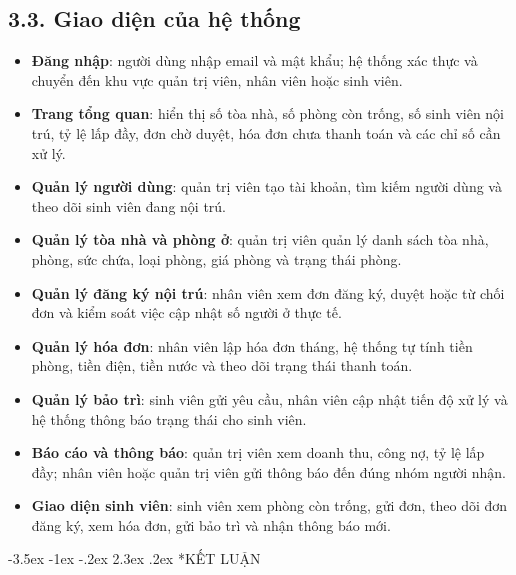 \documentclass[13pt,a4paper]{extarticle}
\makeatletter
\renewcommand\section{\@startsection {section}{1}{\z@}%
	{-3.5ex \@plus -1ex \@minus -.2ex}%
	{2.3ex \@plus .2ex}%
	{\centering\normalfont\Large\bfseries}}
\makeatother
\begin{document}
	\subsection*{3.3. Giao diện của hệ thống}
	\begin{itemize}
		\item \textbf{Đăng nhập}: người dùng nhập email và mật khẩu; hệ thống xác thực và chuyển đến khu vực quản trị viên, nhân viên hoặc sinh viên.
		\item \textbf{Trang tổng quan}: hiển thị số tòa nhà, số phòng còn trống, số sinh viên nội trú, tỷ lệ lấp đầy, đơn chờ duyệt, hóa đơn chưa thanh toán và các chỉ số cần xử lý.
		\item \textbf{Quản lý người dùng}: quản trị viên tạo tài khoản, tìm kiếm người dùng và theo dõi sinh viên đang nội trú.
		\item \textbf{Quản lý tòa nhà và phòng ở}: quản trị viên quản lý danh sách tòa nhà, phòng, sức chứa, loại phòng, giá phòng và trạng thái phòng.
		\item \textbf{Quản lý đăng ký nội trú}: nhân viên xem đơn đăng ký, duyệt hoặc từ chối đơn và kiểm soát việc cập nhật số người ở thực tế.
		\item \textbf{Quản lý hóa đơn}: nhân viên lập hóa đơn tháng, hệ thống tự tính tiền phòng, tiền điện, tiền nước và theo dõi trạng thái thanh toán.
		\item \textbf{Quản lý bảo trì}: sinh viên gửi yêu cầu, nhân viên cập nhật tiến độ xử lý và hệ thống thông báo trạng thái cho sinh viên.
		\item \textbf{Báo cáo và thông báo}: quản trị viên xem doanh thu, công nợ, tỷ lệ lấp đầy; nhân viên hoặc quản trị viên gửi thông báo đến đúng nhóm người nhận.
		\item \textbf{Giao diện sinh viên}: sinh viên xem phòng còn trống, gửi đơn, theo dõi đơn đăng ký, xem hóa đơn, gửi bảo trì và nhận thông báo mới.
	\end{itemize}
	
	\section*{KẾT LUẬN}
	
\end{document}
